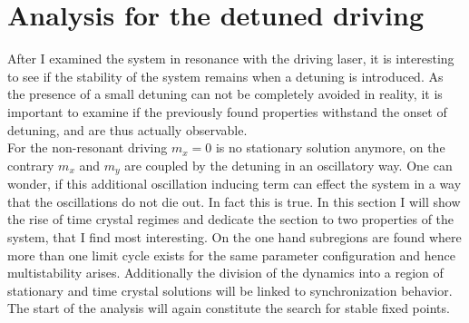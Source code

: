 \newpage
\section{Analysis for the detuned driving}\label{sec:detuned_analysis}%
After I examined the system in resonance with the driving laser, it is interesting to see if the stability of the system remains when a detuning is introduced. As the presence of a small detuning can not be completely avoided in reality, it is important to examine if the previously found properties withstand the onset of detuning, and are thus actually observable.\\
For the non-resonant driving $m_x=0$ is no stationary solution anymore, on the contrary $m_x$ and $m_y$ are coupled by the detuning in an oscillatory way. One can wonder, if this additional oscillation inducing term can effect the system in a way that the oscillations do not die out. In fact this is true. In this section I will show the rise of time crystal regimes and dedicate the section to two properties of the system, that I find most interesting. On the one hand subregions are found where more than one limit cycle exists for the same parameter configuration and hence multistability arises. Additionally the division of the dynamics into a region of stationary and time crystal solutions will be linked to synchronization behavior. The start of the analysis will again constitute the search for stable fixed points.


